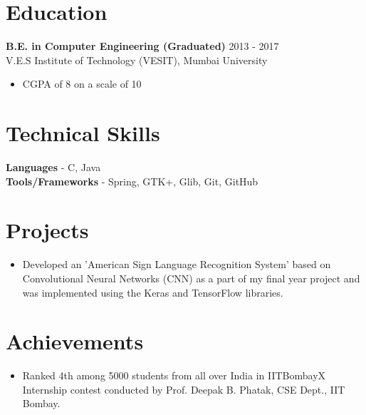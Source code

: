 \documentclass[12pt,margin, centered]{res}
\begin{document}
\begin{resume}
\section{Education}
\vspace{10mm}
\textbf{B.E. in Computer Engineering (Graduated)} \hfill 2013 - 2017 \\
V.E.S Institute of Technology (VESIT), Mumbai University
\begin{itemize}
 \item CGPA of 8 on a scale of 10
\end{itemize}

\section{Technical \hspace{2mm} Skills}
\vspace{10mm}
\textbf{Languages} - C, Java \\
\textbf{Tools/Frameworks} - Spring, GTK+, Glib, Git, GitHub

\section{Projects}
\vspace{10mm}
\begin{itemize}[leftmargin=*]
 \item Developed an 'American Sign Language Recognition System' based on Convolutional Neural Networks (CNN) as a part of my final year project and was implemented using the Keras and TensorFlow libraries.
\end{itemize}


\section{Achievements}
\vspace{12mm}
\begin{itemize}[leftmargin=*]
\item Ranked 4th among 5000 students from all over India in IITBombayX Internship contest conducted by Prof. Deepak B. Phatak, CSE Dept., IIT Bombay.
\end{itemize}


\end{resume}
\end{document}
